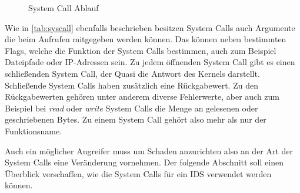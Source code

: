         \begin{figure}[ht]
            \centering
            \caption{System Call Ablauf}
            \label{fig:syscallAblauf}
        \end{figure}

        Wie in \autoref{tab:syscall} ebenfalls beschrieben besitzen System Calls auch Argumente die beim Aufrufen mitgegeben werden können.        Das können neben bestimmten Flags, welche die Funktion der System Calls bestimmen, auch zum Beispiel Dateipfade oder IP-Adressen sein. 
        Zu jedem öffnenden System Call gibt es einen schließenden System Call, der Quasi die Antwort des Kernels darstellt.
        Schließende System Calls haben zusätzlich eine Rückgabewert.
        Zu den Rückgabewerten gehören unter anderem diverse Fehlerwerte, aber auch zum Beispiel bei \textit{read} oder \textit{write} System Calls die Menge an gelesenen oder geschriebenen Bytes.
        Zu einem System Call gehört also mehr als nur der Funktionsname.


        Auch ein möglicher Angreifer muss um Schaden anzurichten also an der Art der System Calls eine Veränderung vornehmen.
        Der folgende Abschnitt soll einen Überblick verschaffen, wie die System Calls für ein \ac{IDS} verwendet werden können.

